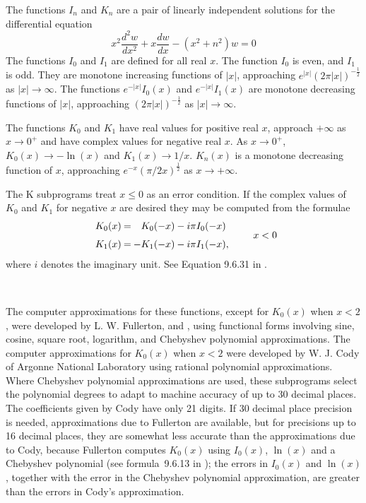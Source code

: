 \documentclass[twoside]{MATH77}
\begin{document}
The functions $I_n$ and $K_n$ are a pair of linearly
independent solutions for the differential equation
\begin{equation*}
x^2\frac{d^2w}{dx^2}+x\frac{dw}{dx}-\left(x^2+n^2\right)w=0
\end{equation*}
The functions $I_0$ and $I_1$ are defined for all real $x$. The function $%
I_0 $ is even, and $I_1$ is odd. They are monotone increasing functions of $%
|x|$, approaching $e^{|x|} (2\pi |x|)^{-\frac{1}{2}}$ as $|x| \rightarrow
\infty $. The functions $e^{-|x|} I_0(x)$ and $e^{-|x|} I_1(x)$ are monotone
decreasing functions of $|x|$, approaching $(2\pi |x|)^{-\frac{1}{2}}$ as $%
|x| \rightarrow \infty .$

The functions $K_0$ and $K_1$ have real values for positive real $x$,
approach $+\infty $ as $x \rightarrow 0^+$ and have complex values for
negative real $x$. As $x \rightarrow 0^+$, $K_0(x) \rightarrow -\ln (x)$ and
$K_1(x) \rightarrow 1/x$. $K_n(x)$ is a monotone decreasing function of $x$,
approaching $e^{-x} (\pi /2x)^{\frac{1}{2}}$ as $x \rightarrow +\infty .$

The K subprograms treat $x\leq 0$ as an error condition. If the complex values
of $K_0$ and $K_1$ for negative $x$ are desired they may be computed from
the formulae
\begin{equation*}
\begin{array}{ll}
\begin{array}{r@{\:}c@{\:}l}
K_0(x) & = & \phantom{-}K_0(-x)-i\pi I_0(-x)
\rule[-10pt]{0pt}{8pt} \\ K_1(x) & = & -K_1(-x)-i\pi I_1(-x),
\end{array}
& \quad x<0
\end{array}
\end{equation*}
where $i$ denotes the imaginary unit. See Equation 9.6.31 in \cite{ams55}.

\vspace{10pt}

\hspace{5pt}\mbox{ }

The computer approximations for these functions, except for $K_0(x)$ when
$x < 2$, were developed by L.  W.  Fullerton, \cite{Fullerton:1973:FNLIB}
and \cite{Fullerton:1977:PSF}, using functional forms involving sine,
cosine, square root, logarithm, and Chebyshev polynomial approximations.
The computer approximations for $K_0(x)$ when $x < 2$ were developed by W.
J.  Cody of Argonne National Laboratory using rational polynomial
approximations.  Where Chebyshev polynomial approximations are used, these
subprograms select the polynomial degrees to adapt to machine accuracy of
up to 30 decimal places.  The coefficients given by Cody have only 21
digits.  If 30 decimal place precision is needed, approximations due to
Fullerton are available, but for precisions up to 16 decimal places, they
are somewhat less accurate than the approximations due to Cody, because
Fullerton computes $K_0(x)$ using $I_0(x)$, $\ln (x)$ and a Chebyshev
polynomial (see formula~9.6.13 in \cite{ams55}); the errors in $I_0(x)$
and $\ln (x)$, together with the error in the Chebyshev polynomial
approximation, are greater than the errors in Cody's approximation.
\end{document}
